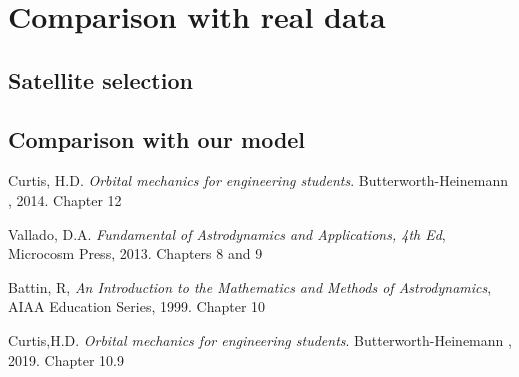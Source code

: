 \documentclass[11pt,a4paper]{report}
\begin{document}
\section{Comparison with real data}

\subsection{Satellite selection}

\subsection{Comparison with our model}

\begin{thebibliography}{9}
Curtis, H.D. 
\textit{Orbital mechanics for engineering students}. 
Butterworth-Heinemann , 2014. Chapter 12

Vallado, D.A.
\textit{Fundamental of Astrodynamics and Applications, 4th
Ed}, Microcosm Press, 2013. Chapters 8 and 9

Battin, R,
\textit{An Introduction to the Mathematics and Methods of
Astrodynamics}, AIAA Education Series, 1999. Chapter 10

Curtis,H.D. 
\textit{Orbital mechanics for engineering students}. 
Butterworth-Heinemann , 2019. Chapter 10.9

\end{thebibliography}
\end{document}
